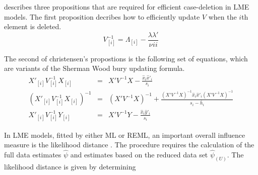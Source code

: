\documentclass[12pt, a4paper]{article}
\begin{document}
\citet{Christensen} describes three propositions that are required
for efficient case-deletion in LME models. The first proposition
decribes how to efficiently update $V$ when the $i$th element is
deleted.
\begin{equation}
V_{[i]}^{-1} = \Lambda_{[i]} - \frac{\lambda
	\lambda\prime}{\nu^{}ii}
\end{equation}


The second of christensen's propostions is the following set of
equations, which are variants of the Sherman Wood bury updating
formula.
\begin{eqnarray}
X'_{[i]}V_{[i]}^{-1}X_{[i]} &=& X' V^{-1}X -
\frac{\hat{x}_{i}\hat{x}'_{i}}{s_{i}}\\
(X'_{[i]}V_{[i]}^{-1}X_{[i]})^{-1} &=& (X' V^{-1}X)^{-1} +
\frac{(X' V^{-1}X)^{-1}\hat{x}_{i}\hat{x}' _{i}
	(X' V^{-1}X)^{-1}}{s_{i}- \bar{h}_{i}}\\
X'_{[i]}V_{[i]}^{-1}Y_{[i]} &=& X\prime V^{-1}Y -
\frac{\hat{x}_{i}\hat{y}' _{i}}{s_{i}}
\end{eqnarray}








In LME models, fitted by either ML or REML, an important overall
influence measure is the likelihood distance \citep{cook82}. The
procedure requires the calculation of the full data estimates
$\hat{\psi}$ and estimates based on the reduced data set
$\hat{\psi}_{(U)}$. The likelihood distance is given by
determining
\end{document}
